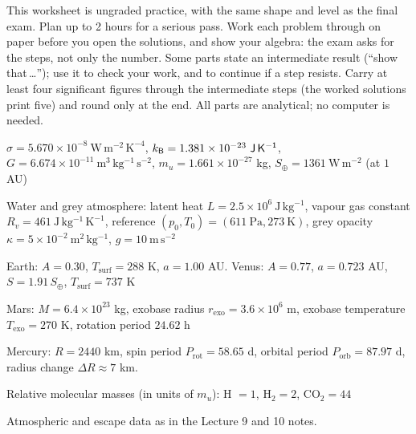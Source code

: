 
\ipsmaketitle

This worksheet is ungraded practice, with the same shape and level as the final exam.
Plan up to 2 hours for a serious pass.
Work each problem through on paper before you open the solutions, and show your algebra:
the exam asks for the steps, not only the number.
Some parts state an intermediate result (``show that\,\ldots''); use it to check your work, and to continue if a step resists.
Carry at least four significant figures through the intermediate steps (the worked solutions print five) and round only at the end.
All parts are analytical; no computer is needed.

\begin{given}
$\sigma = 5.670 \times 10^{-8}\ \mathrm{W\,m^{-2}\,K^{-4}}$,\quad
$\kB = 1.381 \times 10^{-23}\ \mathrm{J\,K^{-1}}$,\quad
$G = 6.674 \times 10^{-11}\ \mathrm{m^3\,kg^{-1}\,s^{-2}}$,\quad
$m_u = 1.661 \times 10^{-27}$ kg,\quad
$S_\oplus = 1361\ \mathrm{W\,m^{-2}}$ (at $1$ AU)

\vskip4pt
Water and grey atmosphere: latent heat $L = 2.5 \times 10^{6}\ \mathrm{J\,kg^{-1}}$, vapour gas constant $R_v = 461\ \mathrm{J\,kg^{-1}\,K^{-1}}$, reference $(p_0, T_0) = (611\ \mathrm{Pa}, 273\ \mathrm{K})$, grey opacity $\kappa = 5 \times 10^{-2}\ \mathrm{m^2\,kg^{-1}}$, $g = 10\ \mathrm{m\,s^{-2}}$

\vskip4pt
Earth: $A = 0.30$, $T_\mathrm{surf} = 288$ K, $a = 1.00$ AU.\quad
Venus: $A = 0.77$, $a = 0.723$ AU, $S = 1.91\,S_\oplus$, $T_\mathrm{surf} = 737$ K

\vskip4pt
Mars: $M = 6.4 \times 10^{23}$ kg, exobase radius $r_\mathrm{exo} = 3.6 \times 10^{6}$ m, exobase temperature $T_\mathrm{exo} = 270$ K, rotation period $24.62$ h

\vskip4pt
Mercury: $R = 2440$ km, spin period $P_\mathrm{rot} = 58.65$ d, orbital period $P_\mathrm{orb} = 87.97$ d, radius change $\Delta R \approx 7$ km.\quad

\vskip4pt
Relative molecular masses (in units of $m_u$): H $= 1$, H$_2 = 2$, CO$_2 = 44$

\vskip4pt
{\footnotesize Atmospheric and escape data as in the Lecture 9 and 10 notes.}
\end{given}




